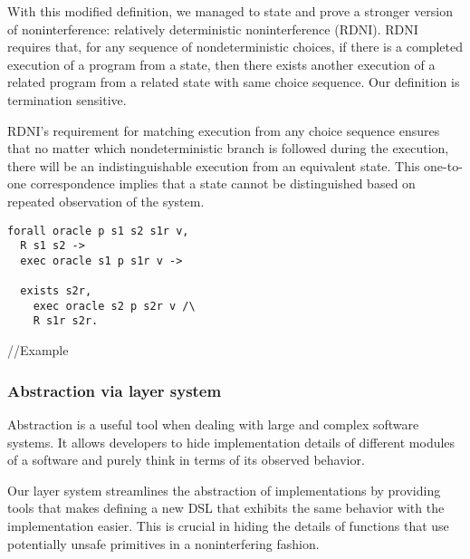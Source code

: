 
With this modified definition, we managed to state and prove a stronger version of noninterference: relatively deterministic noninterference (RDNI). RDNI requires that, for any sequence of nondeterministic choices, if there is a completed execution of a program from a state, then there exists another execution of a related program from a related state with same choice sequence. Our definition is termination sensitive.

RDNI's requirement for matching execution from any choice sequence ensures that no matter which nondeterministic branch is followed during the execution, there will be an indistinguishable execution from an equivalent state. This one-to-one correspondence implies that a state cannot be distinguished based on repeated observation of the system.

\begin{lstlisting}
forall oracle p s1 s2 s1r v,
  R s1 s2 ->
  exec oracle s1 p s1r v ->

  exists s2r,
    exec oracle s2 p s2r v /\
    R s1r s2r.
\end{lstlisting}

//Example




\subsubsection*{Abstraction via layer system}
Abstraction is a useful tool when dealing with large and complex software systems.
It allows developers to hide implementation details of different modules of a software and purely think in terms of its observed behavior.

Our layer system streamlines the abstraction of implementations by providing tools that makes defining a new DSL that exhibits the same behavior with the implementation easier.
This is crucial in hiding the details of functions that use potentially unsafe primitives in a noninterfering fashion.\\

